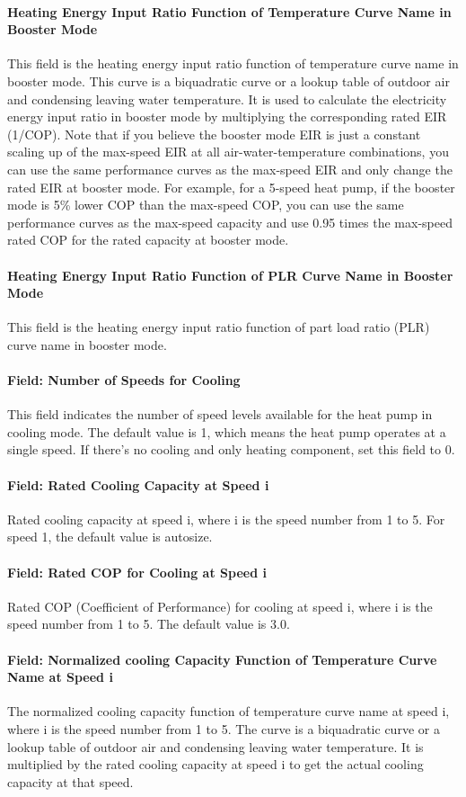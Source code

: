 \paragraph{Heating Energy Input Ratio Function of Temperature Curve Name in
Booster Mode} This field is the heating energy input ratio function of
temperature curve name in booster mode. This curve is a biquadratic curve or a
lookup table of outdoor air and condensing leaving water temperature. It is used
to calculate the electricity energy input ratio in booster mode by multiplying
the corresponding rated EIR (1/COP). Note that if you believe the booster mode
EIR is just a constant scaling up of the max-speed EIR at all
air-water-temperature combinations, you can use the same performance curves as
the max-speed EIR and only change the rated EIR at booster mode.
For example, for a 5-speed heat pump, if the booster mode is 5\% lower COP 
than the max-speed COP, you can use the same performance curves as the max-speed
capacity and use 0.95 times the max-speed rated COP for the rated capacity at booster mode.
\paragraph{Heating Energy Input Ratio Function of PLR Curve Name in Booster
Mode} This field is the heating energy input ratio function of part load ratio
(PLR) curve name in booster mode.
\paragraph{Field: Number of Speeds for Cooling} This field indicates the number
of speed levels available for the heat pump in cooling mode. The default value
is 1, which means the heat pump operates at a single speed. If there's no
cooling and only heating component, set this field to 0.
\paragraph{Field: Rated Cooling Capacity at Speed i} Rated cooling capacity at
speed i, where i is the speed number from 1 to 5. For speed 1, the default value
is autosize.
\paragraph{Field: Rated COP for Cooling at Speed i} Rated COP (Coefficient of
Performance) for cooling at speed i, where i is the speed number from 1 to 5.
The default value is 3.0.
\paragraph{Field: Normalized cooling Capacity Function of Temperature Curve Name
at Speed i} The normalized cooling capacity function of temperature curve name
at speed i, where i is the speed number from 1 to 5. The curve is a biquadratic
curve or a lookup table of outdoor air and condensing leaving water temperature.
It is multiplied by the rated cooling capacity at speed i to get the actual
cooling capacity at that speed.
